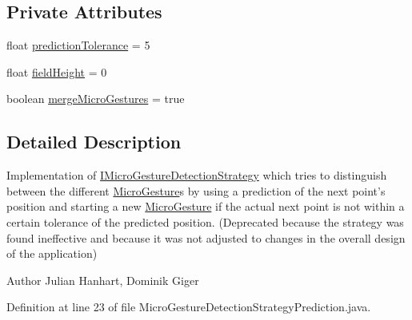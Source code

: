 \subsection*{Private Attributes}
\begin{DoxyCompactItemize}
\item 
float \hyperlink{classch_1_1zhaw_1_1ba10__bsha__1_1_1strategies_1_1MicroGestureDetectionStrategyPrediction_ad38574af775edfe073493925952ea556}{predictionTolerance} = 5
\item 
float \hyperlink{classch_1_1zhaw_1_1ba10__bsha__1_1_1strategies_1_1MicroGestureDetectionStrategyPrediction_a310e66b34b2d214baa3e43f64509129a}{fieldHeight} = 0
\item 
boolean \hyperlink{classch_1_1zhaw_1_1ba10__bsha__1_1_1strategies_1_1MicroGestureDetectionStrategyPrediction_afdc3a70a63ee24fa10bc8c77729d5423}{mergeMicroGestures} = true
\end{DoxyCompactItemize}


\subsection{Detailed Description}
Implementation of \hyperlink{interfacech_1_1zhaw_1_1ba10__bsha__1_1_1strategies_1_1IMicroGestureDetectionStrategy}{IMicroGestureDetectionStrategy} which tries to distinguish between the different \hyperlink{}{MicroGesture}s by using a prediction of the next point's position and starting a new \hyperlink{}{MicroGesture} if the actual next point is not within a certain tolerance of the predicted position. (Deprecated because the strategy was found ineffective and because it was not adjusted to changes in the overall design of the application)

\begin{DoxyAuthor}{Author}
Julian Hanhart, Dominik Giger 
\end{DoxyAuthor}


Definition at line 23 of file MicroGestureDetectionStrategyPrediction.java.

